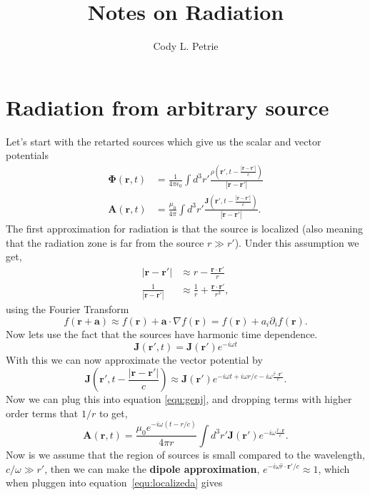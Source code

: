 \documentclass[12pt]{article}
\title{Notes on Radiation}
\author{Cody L. Petrie}
\newcommand{\wavr}{\left|\mathbf{r}-\mathbf{r}'\right|}
\newcommand{\br}{\mathbf{r}}
\newcommand{\tret}{t-\frac{\wavr}{c}}
\begin{document}
\maketitle

\section*{Radiation from arbitrary source}
Let's start with the retarted sources which give us the scalar and vector potentials
\begin{align}
   \mathbf{\Phi}(\br,t) &= \frac{1}{4\pi\epsilon_0} \int d^3r' \frac{\rho(\br',\tret)}{\wavr} \label{equ:genphi} \\
   \mathbf{A}(\br,t) &= \frac{\mu_0}{4\pi} \int d^3r' \frac{\mathbf{J}(\br',\tret)}{\wavr}. \label{equ:genj}
\end{align}
The first approximation for radiation is that the source is localized (also meaning that the radiation zone is far from the source $r \gg r'$). Under this assumption we get,
\begin{align}
   \wavr &\approx r - \frac{\br \cdot \br'}{r} \label{equ:approxwr} \\
   \frac{1}{\wavr} &\approx \frac{1}{r} + \frac{\br \cdot \br'}{r^3}, \label{equ:approxwrm1}
\end{align}
using the Fourier Transform
\begin{equation}
   f(\br+\mathbf{a}) \approx f(\br) + \mathbf{a} \cdot \nabla f(\br) = f(\br) + a_i \partial_i f(\br).
\end{equation}
Now lets use the fact that the sources have harmonic time dependence.
\begin{equation}
   \mathbf{J}(\br',t) = \mathbf{J}(\br')e^{-i\omega t}
\end{equation}
With this we can now approximate the vector potential by
\begin{equation}
   \mathbf{J}(\br',\tret) \approx \mathbf{J}(\br')e^{-i\omega t + i\omega r/c - i\omega \frac{\hat{r} \cdot \br'}{c}}.
\end{equation}
Now we can plug this into equation \ref{equ:genj}, and dropping terms with higher order terms that $1/r$ to get,
\begin{equation}
   \mathbf{A}(\br,t) = \frac{\mu_0e^{-i\omega(t-r/c)}}{4\pi r} \int d^3r' \mathbf{J}(\br')e^{-i\omega \frac{\hat{r} \cdot \br}{c}}.
   \label{equ:localizeda}
\end{equation}
Now is we assume that the region of sources is small compared to the wavelength, $c/\omega \gg r'$,  then we can make the \textbf{dipole approximation}, $e^{-i\omega \hat{r}\cdot\br'/c} \approx 1$, which when pluggen into equation~\ref{equ:localizeda} gives
\end{document}
